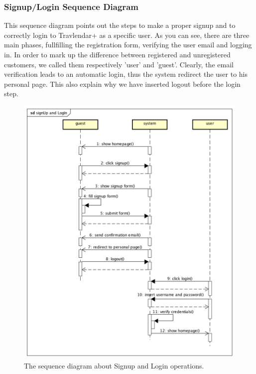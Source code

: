 \subsubsection{Signup/Login Sequence Diagram}

This sequence diagram points out the steps to make a proper signup and to correctly login to Travlendar+ as a specific
user. As you can see, there are three main phases, fullfilling the registration form, verifying the user email and logging in. 
In order to mark up the difference between  registered and  unregistered customers, we called them respectively 'user' and 'guest'. 
Clearly, the email verification leads to an automatic login, thus the system redirect the user to his personal page. This also explain why we have inserted logout before the login step. 

\begin{figure}[htp]
	
	\centering
	\includegraphics[width=\textwidth]{sequencediagrams/signup-logIn}
	\caption{The sequence diagram about Signup and Login operations.}
	\label{fig:signup-login} 

\end{figure}
\newpage

